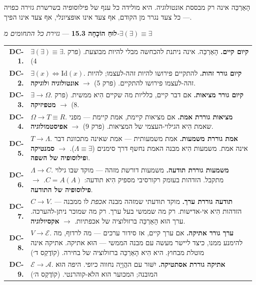 \documentclass[10pt, openany, oneside]{book}
\renewcommand{\footnotesize}{\fontsize{8.5}{11}\selectfont}
\begin{document}
\noindent הָאַרְכֵּה אינה רק מבססת אונטולוגיה. היא מולידה כל ענף של פילוסופיה בשרשרת גזירה כפויה — כל צעד נגרר מן הקודם, אף צעד אינו אופציונלי, אף צעד אינו הפיך.

\vspace{0.3em}

\textbf{לוּחַ הוֹכָחָה 15.3} --- \textit{גזירת כל התחומים מ-$\exists(\exists) \equiv \exists$}

\vspace{0.5em}

{\footnotesize
\noindent\begin{tabular}{r p{}}
\textbf{DC-1.} & $\exists(\exists) \equiv \exists$. \textbf{קיום קיים.} הָאַרְכֵּה. אינה ניתנת להכחשה מבלי להיות מבוצעת. (פרק 4) \\[0.3em]
\textbf{DC-2.} & $\exists(x) \iff \text{Id}(x)$. \textbf{קיום גורר זהות.} להתקיים פירושו להיות זהה-לעצמו; להיות זהה-לעצמו פירושו להתקיים. (פרק 5) $\to$ \textbf{אונטולוגיה} ו\textbf{לוגיקה}. \\[0.3em]
\textbf{DC-3.} & $\exists \to \Omega$. \textbf{קיום גורר מציאות.} אם דבר קיים, כלליות מה שקיים הִיא ממשית. (פרק 8) $\to$ \textbf{מטפיזיקה}. \\[0.3em]
\textbf{DC-4.} & $\Omega \to T \equiv R$. \textbf{מציאות גוררת אמת.} אם מציאות קיימת, אמת קיימת — מפני שאמת הִיא הגילוי-העצמי של המציאות. (פרק 9) $\to$ \textbf{אפיסטמולוגיה}. \\[0.3em]
\textbf{DC-5.} & $T \to \Lambda$. \textbf{אמת גוררת משמעות.} אמת משמעותית — אמת שאינה מתכוונת דבר אינה אמת. משמעות הִיא מבנה האמת נחשף דרך סימנים ($\Lambda \equiv \exists$). $\to$ \textbf{סמנטיקה} ו\textbf{פילוסופיה של השפה}. \\[0.3em]
\textbf{DC-6.} & $\Lambda \to C$. \textbf{משמעות גוררת תודעה.} משמעות דורשת מזהה — מוקד שבו גילוי מתקבל. הזדהות בעומק רקורסיבי מספיק הִיא תודעה: $C = A(A)$. $\to$ \textbf{פילוסופיה של התודעה}. \\[0.3em]
\textbf{DC-7.} & $C \to V$. \textbf{תודעה גוררת ערך.} מוקד תודעתי שמזהה מבנה \textit{אכפת} לו ממבנה — הזדהות הִיא אי-אדישות. רק מה שממשי בעל ערך. רק מה שמוכר ניתן-להערכה. ערך הוּא הָאַרְכֵּה ברזולוציה של אכפתיות. $\to$ \textbf{אקסיולוגיה}. \\[0.3em]
\textbf{DC-8.} & $V \to \mathcal{E}$. \textbf{ערך גורר אתיקה.} אם ערך קיים, אז סידור ערכים — מה לרדוף, מה להימנע ממנו, כיצד ליישר מעשה עם מבנה הממשי — הוּא אתיקה. אתיקה אינה מוטלת מבחוץ. היא הִיא הָאַרְכֵּה ברזולוציה של בחירה. (קוֹדֶקְס ד׳) \\[0.3em]
\textbf{DC-9.} & $\mathcal{E} \to \mathcal{A}$. \textbf{אתיקה גוררת אסתטיקה.} יִשּׁוּר עם ההֲוָיָה נחווה כיופי. היפה הוּא המובנה; המכוער הוא הלא-קוהרנטי. (קוֹדֶקְס ה׳) \\[0.3em]

\end{tabular}}
\end{document}
